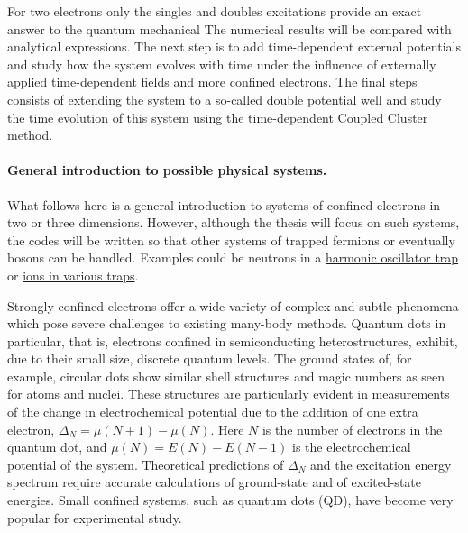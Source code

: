 \documentclass[%
oneside,                 %
final,                   %
10pt]{article}
\begin{document}
For two electrons
only the singles and doubles excitations provide an exact answer to
the quantum mechanical The numerical results will be compared with
analytical expressions. The next step is to add time-dependent
external potentials and study how the system evolves with time under
the influence of externally applied time-dependent fields and more confined electrons.  The final steps consists of extending the system to a so-called double potential well and study the time evolution of this system using the time-dependent Coupled Cluster method.




\paragraph{General introduction to possible physical systems.}
What follows here is a general introduction to systems of confined
electrons in two or three dimensions.  However, although the thesis
will focus on such systems, the codes will be written so that other
systems of trapped fermions or eventually bosons can be
handled. Examples could be neutrons in a \href{{https://journals.aps.org/prc/abstract/10.1103/PhysRevC.84.044306}}{harmonic oscillator trap}
or \href{{https://journals.aps.org/rmp/abstract/10.1103/RevModPhys.72.895}}{ions in various traps}.


Strongly confined electrons offer a wide variety of complex and subtle
phenomena which pose severe challenges to existing many-body methods.
Quantum dots in particular, that is, electrons confined in
semiconducting heterostructures, exhibit, due to their small size,
discrete quantum levels.  The ground states of, for example, circular
dots show similar shell structures and magic numbers as seen for atoms
and nuclei. These structures are particularly evident in measurements
of the change in electrochemical potential due to the addition of one
extra electron, $\Delta_N=\mu(N+1)-\mu(N)$. Here $N$ is the number of
electrons in the quantum dot, and $\mu(N)=E(N)-E(N-1)$ is the
electrochemical potential of the system.  Theoretical predictions of
$\Delta_N$ and the excitation energy spectrum require accurate
calculations of ground-state and of excited-state energies.  Small
confined systems, such as quantum dots (QD), have become very popular
for experimental study. 
\end{document}
